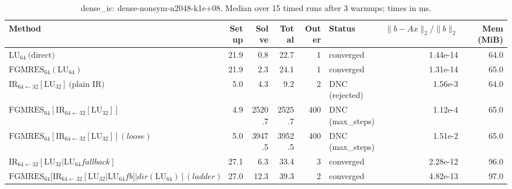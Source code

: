 \begin{table}[t]
\centering
\small
\caption{dense_ic: dense-nonsym-n2048-k1e+08. Median over 15 timed runs after 3 warmups; times in ms.}
\label{tab:dense_ic-dense-nonsym-n2048-k1e+08}
\begin{tabular}{lrrrrlrr}
\hline
Method & Setup & Solve & Total & Outer & Status & $\|b-Ax\|_2/\|b\|_2$ & Mem (MiB) \\
\hline
$\mathrm{LU}_{64}\ \text{(direct)}$ & 21.9 & 0.8 & 22.7 & 1 & converged & 1.44e-14 & 64.0 \\
$\mathrm{FGMRES}_{64}(\mathrm{LU}_{64})$ & 21.9 & 2.3 & 24.1 & 1 & converged & 1.31e-14 & 65.0 \\
$\mathrm{IR}_{64\leftarrow 32}[\mathrm{LU}_{32}]\ \text{(plain IR)}$ & 5.0 & 4.3 & 9.2 & 2 & DNC (rejected) & 1.56e-3 & 64.0 \\
$\mathrm{FGMRES}_{64}[\mathrm{IR}_{64\leftarrow 32}[\mathrm{LU}_{32}]]$ & 4.9 & 2520.7 & 2525.7 & 400 & DNC (max_steps) & 1.12e-4 & 65.0 \\
$\mathrm{FGMRES}_{64}[\mathrm{IR}_{64\leftarrow 32}[\mathrm{LU}_{32}]] (loose)$ & 5.0 & 3947.5 & 3952.5 & 400 & DNC (max_steps) & 1.51e-2 & 65.0 \\
$\mathrm{IR}_{64\leftarrow 32}[\mathrm{LU}_{32} | \mathrm{LU}_{64} fallback]$ & 27.1 & 6.3 & 33.4 & 3 & converged & 2.28e-12 & 96.0 \\
$\mathrm{FGMRES}_{64}[\mathrm{IR}_{64\leftarrow 32}[\mathrm{LU}_{32}|\mathrm{LU}_{64} fb]|dir(\mathrm{LU}_{64})] (ladder)$ & 27.0 & 12.3 & 39.3 & 2 & converged & 4.82e-13 & 97.0 \\
\hline
\end{tabular}
\end{table}
